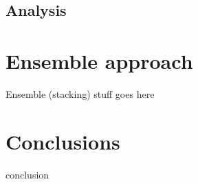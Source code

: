 \documentclass[11pt]{article}
\newcommand{\drafting}[1]{\textcolor{OliveGreen}{#1}}
\begin{document}
\subsection{Analysis}




\section{Ensemble approach}

\drafting{
Ensemble (stacking) stuff goes here
}

\section{Conclusions}

\drafting{
	conclusion
}


\nocite{mukherjee_what_2013}
\nocite{rayana_collective_2015}

\nocite{sklearn_pedregosa_scikit-learn_2011}
\nocite{gensim_rehurek_software_2010}


\end{document}
